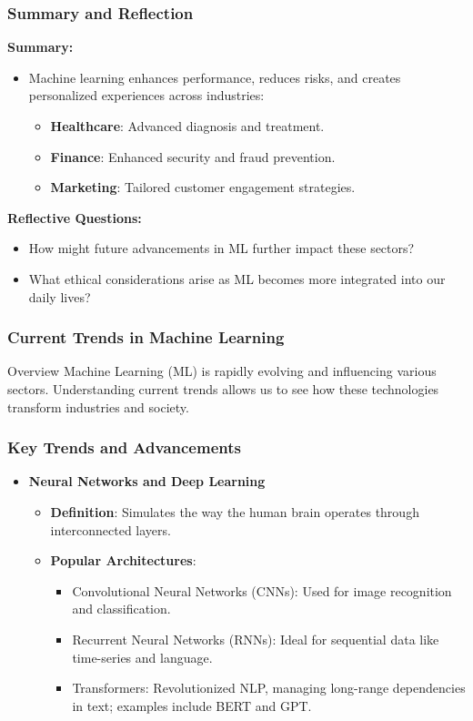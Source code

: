 \documentclass[aspectratio=169]{beamer}
\begin{document}
\begin{frame}[fragile]
    \frametitle{Summary and Reflection}
    \textbf{Summary:}
    \begin{itemize}
        \item Machine learning enhances performance, reduces risks, and creates personalized experiences across industries:
        \begin{itemize}
            \item \textbf{Healthcare}: Advanced diagnosis and treatment.
            \item \textbf{Finance}: Enhanced security and fraud prevention.
            \item \textbf{Marketing}: Tailored customer engagement strategies.
        \end{itemize}
    \end{itemize}

    \textbf{Reflective Questions:}
    \begin{itemize}
        \item How might future advancements in ML further impact these sectors?
        \item What ethical considerations arise as ML becomes more integrated into our daily lives?
    \end{itemize}
\end{frame}

\begin{frame}[fragile]
    \frametitle{Current Trends in Machine Learning}
    \begin{block}{Overview}
        Machine Learning (ML) is rapidly evolving and influencing various sectors. Understanding current trends allows us to see how these technologies transform industries and society.
    \end{block}
\end{frame}

\begin{frame}[fragile]
    \frametitle{Key Trends and Advancements}
    \begin{itemize}
        \item \textbf{Neural Networks and Deep Learning}
        \begin{itemize}
            \item \textbf{Definition}: Simulates the way the human brain operates through interconnected layers.
            \item \textbf{Popular Architectures}:
            \begin{itemize}
                \item Convolutional Neural Networks (CNNs): Used for image recognition and classification.
                \item Recurrent Neural Networks (RNNs): Ideal for sequential data like time-series and language.
                \item Transformers: Revolutionized NLP, managing long-range dependencies in text; examples include BERT and GPT.
            \end{itemize}
        \end{itemize}
    \end{itemize}
\end{frame}
\end{document}
